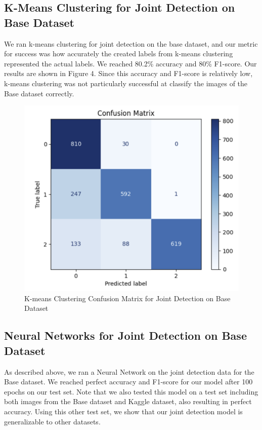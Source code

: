 \documentclass{article}
\begin{document}
\subsection{K-Means Clustering for Joint Detection on Base Dataset}
We ran k-means clustering for joint detection on the base dataset, and our metric for success was how accurately the created labels from k-means clustering represented the actual labels. We reached 80.2\% accuracy and 80\% F1-score. Our results are shown in Figure 4. Since this accuracy and F1-score is relatively low, k-means clustering was not particularly successful at classify the images of the Base dataset correctly.

\begin{figure}[h]
\begin{center}
\centerline{\includegraphics[width=\columnwidth]{kmeans_base_joint.png}}
\caption{K-means Clustering Confusion Matrix for Joint Detection on Base Dataset}
\end{center}
\end{figure}

\subsection{Neural Networks for Joint Detection on Base Dataset}
As described above, we ran a Neural Network on the joint detection data for the Base dataset. We reached perfect accuracy and F1-score for our model after 100 epochs on our test set. Note that we also tested this model on a test set including both images from the Base dataset and Kaggle dataset, also resulting in perfect accuracy. Using this other test set, we show that our joint detection model is generalizable to other datasets.
\end{document}
